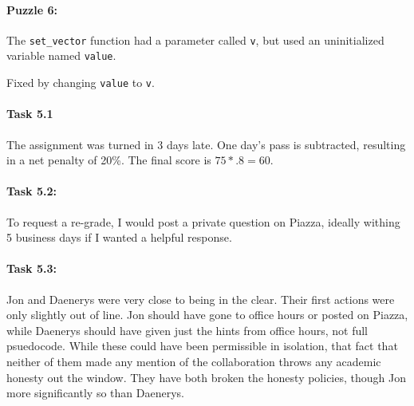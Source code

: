 \documentclass[11pt]{article}
\begin{document}
\paragraph{Puzzle 6:}

The \verb|set_vector| function had a parameter called \verb|v|, but used an uninitialized variable named \verb|value|.

Fixed by changing \verb|value| to \verb|v|.

\paragraph{Task 5.1} The assignment was turned in 3 days late. One day's pass is subtracted, resulting in a net penalty of 20\%. The final score is $75 * .8 = 60$.

\paragraph{Task 5.2:} To request a re-grade, I would post a private question on Piazza, ideally withing 5 business days if I wanted a helpful response.

\paragraph{Task 5.3:} Jon and Daenerys were very close to being in the clear. Their first actions were only slightly out of line. Jon should have gone to office hours or posted on Piazza, while Daenerys should have given just the hints from office hours, not full psuedocode. While these could have been permissible in isolation, that fact that neither of them made any mention of the collaboration throws any academic honesty out the window. They have both broken the honesty policies, though Jon more significantly so than Daenerys.

\label{mylastpagelabel}
\end{document}
